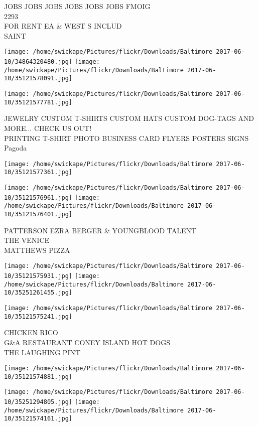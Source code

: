 \documentclass[10pt,letterpaper]{article}
\begin{document}
JOBS JOBS JOBS JOBS JOBS JOBS FMOIG\\
2293\\
FOR RENT EA \& WEST S INCLUD\\
SAINT
\pagebreak

\texttt{[image: /home/swickape/Pictures/flickr/Downloads/Baltimore 2017-06-10/34864320480.jpg]}
\texttt{[image: /home/swickape/Pictures/flickr/Downloads/Baltimore 2017-06-10/35121578091.jpg]}

\texttt{[image: /home/swickape/Pictures/flickr/Downloads/Baltimore 2017-06-10/35121577781.jpg]}

JEWELRY CUSTOM T{-}SHIRTS CUSTOM HATS CUSTOM DOG{-}TAGS AND MORE... CHECK US OUT!\\
PRINTING T{-}SHIRT PHOTO BUSINESS CARD FLYERS POSTERS SIGNS\\
Pagoda
\pagebreak

\texttt{[image: /home/swickape/Pictures/flickr/Downloads/Baltimore 2017-06-10/35121577361.jpg]}

\vspace{0.25in}
\texttt{[image: /home/swickape/Pictures/flickr/Downloads/Baltimore 2017-06-10/35121576961.jpg]}
\texttt{[image: /home/swickape/Pictures/flickr/Downloads/Baltimore 2017-06-10/35121576401.jpg]}

PATTERSON EZRA BERGER \& YOUNGBLOOD TALENT\\
THE VENICE\\
MATTHEWS PIZZA
\pagebreak

\texttt{[image: /home/swickape/Pictures/flickr/Downloads/Baltimore 2017-06-10/35121575931.jpg]}
\texttt{[image: /home/swickape/Pictures/flickr/Downloads/Baltimore 2017-06-10/35251261455.jpg]}

\texttt{[image: /home/swickape/Pictures/flickr/Downloads/Baltimore 2017-06-10/35121575241.jpg]}

CHICKEN RICO\\
G\&A RESTAURANT CONEY ISLAND HOT DOGS\\
THE LAUGHING PINT
\pagebreak

\texttt{[image: /home/swickape/Pictures/flickr/Downloads/Baltimore 2017-06-10/35121574881.jpg]}

\vspace{0.25in}
\texttt{[image: /home/swickape/Pictures/flickr/Downloads/Baltimore 2017-06-10/35251294805.jpg]}
\texttt{[image: /home/swickape/Pictures/flickr/Downloads/Baltimore 2017-06-10/35121574161.jpg]}
\end{document}

